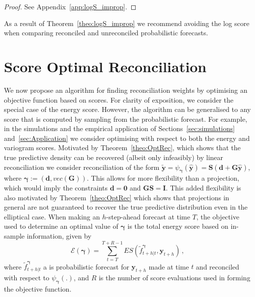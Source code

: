 \documentclass[a4paper,12pt]{article}
\theoremstyle{definition}
\begin{document}
\begin{proof}
	See Appendix~\ref{app:logS_improp}.
\end{proof}

As a result of Theorem~\ref{theo:logS_improp} we recommend avoiding the log score when comparing reconciled and unreconciled probabilistic forecasts.


\section{Score Optimal Reconciliation}\label{sec:scoreoptSGD}

We now propose an algorithm for finding reconciliation weights by optimising an objective function based on scores. For clarity of exposition, we consider the special case of the energy score. However, the algorithm can be generalised to any score that is computed by sampling from the probabilistic forecast. For example, in the simulations and the empirical application of Sections~\ref{sec:simulations} and~\ref{sec:Application} we consider optimising with respect to both the energy and variogram scores. Motivated by Theorem~\ref{theo:OptRec}, which shows that the true predictive density can be recovered (albeit only infeasibly) by linear reconciliation we consider reconciliation of the form $\tilde{\bm{y}}=\psi_{\bm{\gamma}}({\bm{\hat{y}}})={\bm{S}}\left(\bm{d}+\bm{G}{\bm{\hat{y}}}\right)$, where ${\bm\gamma}:=\left(\bm{d},vec(\bm{G})\right)$. This allows for more flexibility than a projection, which would imply the constraints $\bm{d}=\bm{0}$ and $\bm{G}\bm{S}=\bm{I}$. This added flexibility is also motivated by Theorem~\ref{theo:OptRec} which shows that projections in general are not guaranteed to recover the true predictive distribution even in the elliptical case. When making an $h$-step-ahead forecast at time $T$, the objective used to determine an optimal value of $\bm{\gamma}$ is the total energy score based on in-sample information, given by
\begin{equation}
\mathcal{E}\left(\bm{\gamma}\right)=\sum\limits_{t=T}^{T+R-1} \textit{ES}(\tilde{f}^{\bm{\gamma}}_{t+h|t},\bm{y}_{t+h})\,,
\label{eq:tes}
\end{equation}
where $\tilde{f}^{\bm{\bm{\gamma}}}_{t+h|t}$ a is probabilistic forecast for $\bm{y}_{t+h}$ made at time $t$ and reconciled with respect to $\psi_{\bm{\gamma}}(.)$, and $R$ is the number of score evaluations used in forming the objective function.
\end{document}
